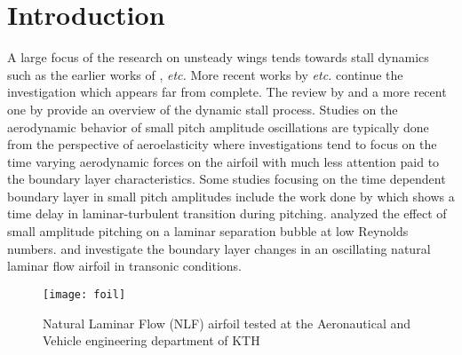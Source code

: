 

\section{Introduction}

A large focus of the research on unsteady wings tends towards stall dynamics such as the earlier works of \cite{mccroskey81,mccroskey82experimental,mccroskey73,mccroskey76,carr1977,ericsson_stall88a,ericsson_stall88b}, \emph{etc.} More recent works by \cite{dunne2015,rival2010,choudhry14,visbal11,visbal14,visbal17,alferez13,rosti16} \emph{etc.} continue the investigation which appears far from complete. The review by \cite{mccroskey82} and a more recent one by \cite{coorke15} provide an overview of the dynamic stall process. Studies on the aerodynamic behavior of small pitch amplitude oscillations are typically done from the perspective of aeroelasticity where investigations tend to focus on the time varying aerodynamic forces on the airfoil with much less attention paid to the boundary layer characteristics. Some studies focusing on the time dependent boundary layer in small pitch amplitudes include the work done by \cite{pascazio96} which shows a time delay in laminar-turbulent transition during pitching. \cite{nati15} analyzed the effect of small amplitude pitching on a laminar separation bubble at low Reynolds numbers. \cite{mai11} and \cite{hebler13} investigate the boundary layer changes in an oscillating natural laminar flow airfoil in transonic conditions. 
\begin{figure}[h]
	\centering
	\texttt{[image: foil]}
	\caption{Natural Laminar Flow (NLF) airfoil tested at the Aeronautical and Vehicle engineering department of KTH \citep{lokatt17,lokattthesis}}
	\label{fig:foil_david}
\end{figure}
